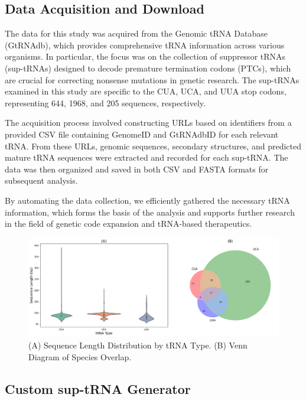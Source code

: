 \subsection{Data Acquisition and Download}

The data for this study was acquired from the Genomic tRNA Database (GtRNAdb), which provides comprehensive tRNA information across various organisms. In particular, the focus was on the collection of suppressor tRNAs (sup-tRNAs) designed to decode premature termination codons (PTCs), which are crucial for correcting nonsense mutations in genetic research. The sup-tRNAs examined in this study are specific to the CUA, UCA, and UUA stop codons, representing 644, 1968, and 205 sequences, respectively.

The acquisition process involved constructing URLs based on identifiers from a provided CSV file containing GenomeID and GtRNAdbID for each relevant tRNA. From these URLs, genomic sequences, secondary structures, and predicted mature tRNA sequences were extracted and recorded for each sup-tRNA. The data was then organized and saved in both CSV and FASTA formats for subsequent analysis.

By automating the data collection, we efficiently gathered the necessary tRNA information, which forms the basis of the analysis and supports further research in the field of genetic code expansion and tRNA-based therapeutics.

\begin{figure}[H]
    \centering
    \includegraphics[width=\textwidth]{images/tRNATypes.png}
    \caption{(A) Sequence Length Distribution by tRNA Type. (B) Venn Diagram of Species Overlap.}
    \label{fig:tRNA_types}
\end{figure}

\subsection{Custom sup-tRNA Generator}

